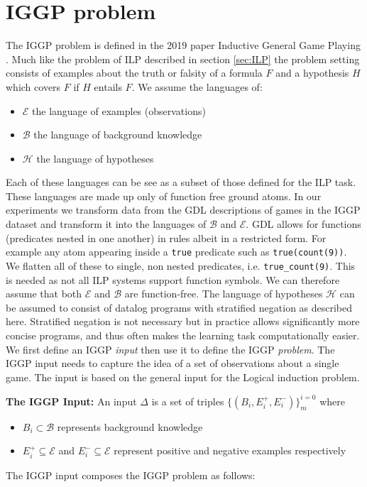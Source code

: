 \chapter{IGGP problem}
\label{ch:IGGP}

The IGGP problem is defined in the 2019 paper Inductive General Game Playing \cite{Cropper/IGGP}. Much like the problem of ILP described in section \ref{sec:ILP} the problem setting consists of examples about the truth or falsity of a formula $F$ and a hypothesis $H$ which covers $F$ if $H$ entails $F$. We assume the languages of:
\begin{itemize}
\item $\mathscr{E}$ the language of examples (observations)
\item $\mathscr{B}$ the language of background knowledge
\item $\mathscr{H}$ the language of hypotheses
\end{itemize} 
Each of these languages can be see as a subset of those defined for the ILP task. These languages are made up only of function free ground atoms\cite{Uwe/Logic}. In our experiments we transform data from the GDL descriptions of games in the IGGP dataset and transform it into the languages of $\mathscr{B}$ and $\mathscr{E}$. GDL allows for functions (predicates nested in one another) in rules albeit in a restricted form. For example any atom appearing inside a \texttt{true} predicate such as \texttt{true(count(9))}. We flatten all of these to single, non nested predicates, i.e. \verb|true_count(9)|. This is needed as not all ILP systems support function symbols. We can therefore assume that both $\mathscr{E}$ and $\mathscr{B}$ are function-free. The language of hypotheses $\mathscr{H}$ can be assumed to consist of datalog programs with stratified negation as described here\cite{Kenneth}. Stratified negation is not necessary but in practice allows significantly more concise programs, and thus often makes the learning task computationally easier. We first define an IGGP \textit{input} then use it to define the IGGP \textit{problem}. The IGGP input needs to capture the idea of a set of observations about a single game. The input is based on the general input for the Logical induction problem.

\textbf{The IGGP Input:} An input $\Delta$ is a set of triples $\{(B_i,E_i^+,E_i^-)\}_m^{i=0}$ where
\begin{itemize}
\item $B_i \subset \mathscr{B}$ represents background knowledge
\item $E_i^+ \subseteq \mathscr{E}$ and $E_i^- \subseteq \mathscr{E}$ represent positive and negative examples respectively
\end{itemize}
The IGGP input composes the IGGP problem as follows:

